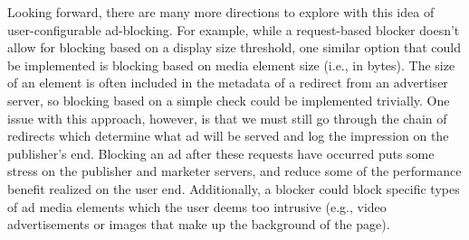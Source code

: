 Looking forward, there are many more directions to explore with this idea of user-configurable ad-blocking.
For example, while a request-based blocker doesn't allow for blocking based on a display size threshold, one similar option that could be implemented is blocking based on media element size (i.e., in bytes).
The size of an element is often included in the metadata of a redirect from an advertiser server, so blocking based on a simple check could be implemented trivially.
One issue with this approach, however, is that we must still go through the chain of redirects which determine what ad will be served and log the impression on the publisher's end.
Blocking an ad after these requests have occurred puts some stress on the publisher and marketer servers, and reduce some of the performance benefit realized on the user end.
Additionally, a blocker could block specific types of ad media elements which the user deems too intrusive (e.g., video advertisements or images that make up the background of the page).
